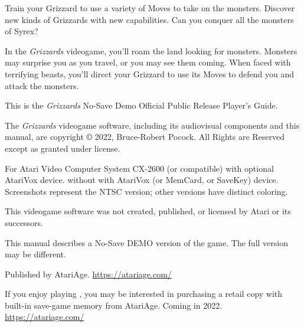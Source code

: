 \documentclass[10pt,twocolumn,openany,article]{memoir}
\begin{document}
\bigskip

Train your Grizzard to  use a variety of Moves to  take on the monsters.
Discover new kinds  of Grizzards with new capabilities.  Can you conquer
all the monsters of Syrex?

\bigskip

In the  \textit{Grizzards} videogame, you'll  roam the land  looking for
monsters. Monsters may  surprise you as you travel, or  you may see them
coming. When faced  with terrifying beasts, you'll  direct your Grizzard
to use its Moves to defend you and attack the monsters.

\vspace{1in}\vfill

This    is    the     \textit{Grizzards}    \ifdefined\NOSAVE    No-Save
\fi\ifdefined\DEMO Demo \fi\ifdefined\ATARIAGESAVE Official \else Public
Release \fi Player's Guide.

\vspace{12pt}

{\small 
The  \textit{Grizzards} videogame  software,  including its  audiovisual
components   and  this   manual,   are   copyright  \copyright{}   2022,
Bruce-Robert  Pocock.   All  Rights  are  Reserved   except  as  granted
under license. }

\bigskip

{\small For Atari Video Computer System CX-2600 (or compatible)
\ifdefined\ATARIAGESAVE   with    optional   AtariVox    device.   \else
\ifdefined\NOSAVE  without  \else  with  \fi AtariVox  (or  MemCard,  or
SaveKey)  device.  \fi Screenshots  represent  the  NTSC version;  other
versions have distinct coloring. }

\bigskip

{\small This videogame software was not created, published, or licensed by Atari
or its successors. }

\vspace{12pt}

\ifdefined\DEMO
\bigskip

This manual  describes a \ifdefined\NOSAVE  No-Save \fi DEMO  version of
the game. The full version may be different.

\fi

Published by AtariAge. \href{https://atariage.com/}{https://atariage.com/}

\ifdefined\ATARIAGESAVE\else  If you  enjoy playing  ,
you  may  be  interested  in  purchasing a  retail  copy  with  built-in
save-game    memory    from    AtariAge.    Coming    in    2022.  
\href{https://atariage.com/}{https://atariage.com/}
\end{document}
